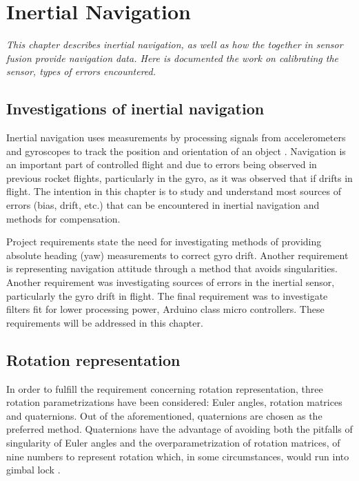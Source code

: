 \chapter{Inertial Navigation}

\textit{This chapter describes inertial navigation, as well as how the  together in sensor fusion provide navigation data. Here is documented the work on calibrating the sensor, types of errors encountered.}

\section{Investigations of inertial navigation}
 
Inertial navigation uses measurements by processing signals from accelerometers and gyroscopes to track the position and orientation of an object \cite{UCAM-CL-TR-696}. Navigation is an important part of controlled flight and due to errors being observed in previous rocket flights, particularly in the gyro, as it was observed that if drifts in flight. The intention in this chapter is to study and understand most sources of errors (bias, drift, etc.) that can be encountered in inertial navigation and methods for compensation. 
 
Project requirements state the need for investigating methods of providing  absolute heading (yaw) measurements to correct gyro drift. 
Another requirement is representing navigation attitude through a method that avoids singularities. 
Another requirement was investigating sources of errors in the inertial sensor, particularly the gyro drift in flight.
The final requirement was to investigate filters fit for lower processing power, Arduino class micro controllers. These requirements will be addressed in this chapter. 

\section{Rotation representation}
 
In order to fulfill the requirement concerning rotation representation, three rotation parametrizations have been considered: Euler angles, rotation matrices and quaternions. Out of the aforementioned, quaternions are chosen as the preferred method. Quaternions have the advantage of avoiding both the pitfalls of singularity of Euler angles \cite{4104344} and the overparametrization of rotation matrices, of nine numbers to represent rotation which, in some circumstances, would run into gimbal lock \cite{desrochers2012intelligent}.

